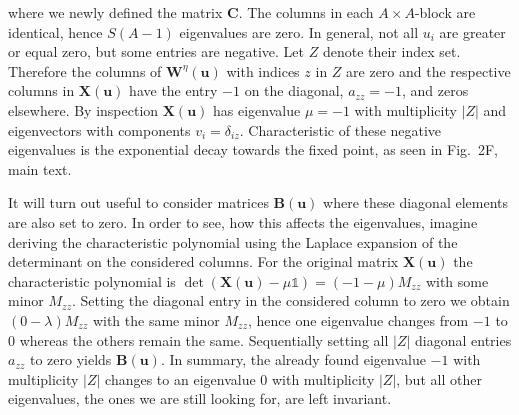 \documentclass[a4paper,11pt]{article}
\newcommand{\vW}{{\mathbf W}}
\newcommand{\vu}{{\mathbf u}}
\newcommand{\vX}{{\mathbf X}}
\newcommand{\vB}{{\mathbf B}}
\newcommand{\vC}{{\mathbf C}}
\begin{document}
\normalsize
where we newly defined the matrix $\vC$. The columns in each $A\times A$-block are identical, hence $S(A-1)$ eigenvalues are zero. %
In general, not all $u_i$ are greater or equal zero, but some entries are negative. Let $Z$ denote their index set. Therefore the columns of $\vW^\eta(\vu)$ with indices $z$ in $Z$ are zero and the respective columns in $\vX(\vu)$ have the entry $-1$ on the diagonal, $a_{zz}=-1$, and zeros elsewhere.
By inspection $\vX(\vu)$ has eigenvalue $\mu=-1$ with multiplicity $|Z|$ and eigenvectors with components $v_i=\delta_{iz}$. Characteristic of these negative eigenvalues is the exponential decay towards the fixed point, as seen in Fig.~2F, main text.

It will turn out useful to consider matrices $\vB(\vu)$ where these diagonal elements are also set to zero. In order to see, how this affects the eigenvalues, imagine deriving the characteristic polynomial using the Laplace expansion of the determinant on the considered columns. For the original matrix $\vX(\vu)$ the characteristic polynomial is $\det(\vX(\vu)-\mu\mathds{1})=(-1-\mu)M_{zz}$ with some minor $M_{zz}$. Setting the diagonal entry in the considered column to zero we obtain $(0-\lambda)M_{zz}$ with the same minor $M_{zz}$, hence one eigenvalue changes from $-1$ to $0$ whereas the others remain the same. Sequentially setting all $|Z|$ diagonal entries $a_{zz}$ to zero yields $\vB(\vu)$. In summary, the already found eigenvalue $-1$ with multiplicity $|Z|$ changes to an eigenvalue $0$ with multiplicity $|Z|$, but all other eigenvalues, the ones we are still looking for, are left invariant. %
\end{document}
